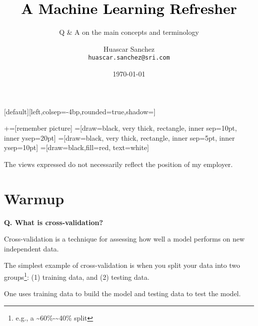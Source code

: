 

\usepackage{framed}
\usepackage[inline]{enumitem}
\usepackage[backend=bibtex]{biblatex}

\title[]{\Huge \textbf{\textcolor{black}{A Machine Learning Refresher}}}
\subtitle{\Large Q \& A on the main concepts and terminology}
\author[HAS]{
\parbox[t]{1.5in}{Huascar Sanchez \\\small\texttt{huascar.sanchez@sri.com}} %
}

\date{\today}

\makeatletter
{}[default][left,colsep=-4bp,rounded=true,shadow=\beamer@themerounded@shadow]
\makeatother


\newcommand\marktopleft[1]{%
    \tikz[overlay,remember picture]
        \node (marker-#1-a) at (-.3em,.3em) {};%
}
\newcommand\markbottomright[2]{%
    \tikz[overlay,remember picture]
        \node (marker-#1-b) at (0em,0em) {};%
}
+=[remember picture]
 =[draw=black, very thick, rectangle, inner sep=10pt, inner ysep=20pt]
 =[draw=black, very thick, rectangle, inner sep=5pt, inner ysep=10pt]
 =[draw=black,fill=red, text=white]

\begin{frame}
\maketitle
\tiny\hspace{1em}The views expressed do not necessarily reflect the position of my employer.
\end{frame}

\section{Warmup}
\begin{frame}[fragile]{\textbf{Q. What is cross-validation?}}
  \begin{wideitemize}
    \item Cross-validation is a technique for assessing how well a model
    performs on new independent data.
    \item The simplest example of cross-validation is when you split your
    data into two groups\footnote{e.g., a \~{}60\%-\~{}40\% split}:
    (1) training data, and (2) testing data.
    \item One uses training data to build the model and testing
    data to test the model.
  \end{wideitemize}
\end{frame}

